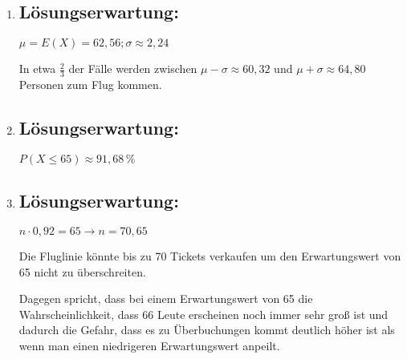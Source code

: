 \begin{langesbeispiel}
{\begin{enumerate}
$P(X=66)\approx 5,94\,\%$\leer

Jede Person, die ein Ticket gekauft hat, kommt mit einer Wahrscheinlichkeit von $92\,\%$ zum Flug und mit einer Wahrscheinlichkeit von $8\,\%$ nicht zum Flug.

	\item \subsection{Lösungserwartung:}
	
$\mu=E(X)=62,56; \sigma\approx 2,24$

In etwa $\frac{2}{3}$ der Fälle werden zwischen $\mu-\sigma\approx 60,32$ und $\mu+\sigma\approx 64,80$ Personen zum Flug kommen.

\item \subsection{Lösungserwartung:}

$P(X\leq 65)\approx 91,68\,\%$

	\item \subsection{Lösungserwartung:}
	
$n\cdot 0,92=65 \rightarrow n=70,65$

Die Fluglinie könnte bis zu 70 Tickets verkaufen um den Erwartungswert von 65 nicht zu überschreiten.

Dagegen spricht, dass bei einem Erwartungswert von 65 die Wahrscheinlichkeit, dass 66 Leute erscheinen noch immer sehr groß ist und dadurch die Gefahr, dass es zu Überbuchungen kommt deutlich höher ist als wenn man einen niedrigeren Erwartungswert anpeilt.
\end{enumerate}}
		\end{langesbeispiel}